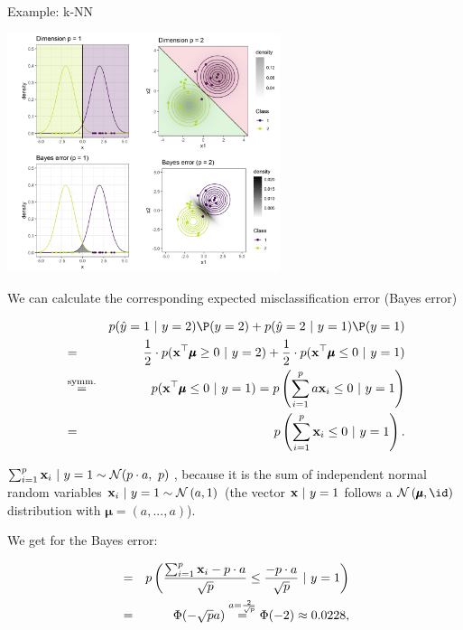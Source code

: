 \documentclass[11pt,compress,t,notes=noshow, xcolor=table]{beamer}
\begin{document}
\begin{vbframe}{Example: k-NN}
\begin{center}
\includegraphics[width = 8cm]{figure/knn_error_plot.png}
\end{center}


\framebreak 

We can calculate the corresponding expected misclassification error (Bayes error)

\begin{footnotesize}
\begin{eqnarray*}
&&  p(\hat y = 1 ~|~y = 2)\P(y = 2) + p(\hat y = 2 ~|~y = 1)\P(y = 1)\\
&=& \frac{1}{2} \cdot p(\xv^\top \pmb\mu \ge 0 ~|~ y = 2) + \frac{1}{2} \cdot p(\xv^\top \pmb\mu \le 0 ~|~ y = 1) \\
&\overset{\text{symm.}}{=}& p(\xv^\top \pmb\mu \le 0 ~|~ y = 1) = p\left(\sum_{i = 1}^p a \xv_i \le 0 ~|~ y = 1\right)\\
  &=& p\left(\sum_{i = 1}^p \xv_i \le 0 ~|~ y = 1\right). 
\end{eqnarray*}
\end{footnotesize}

$\sum_{i = 1}^p \mathbf{x}_i ~|~ y = 1\sim \mathcal{N}(p \cdot a,~ p)$\,, because it is the sum of independent normal random variables $\mathbf{x}_i ~|~ y = 1 \sim \mathcal{N}\left(a, 1\right)$ (the vector $\mathbf{x} ~|~ y = 1$ follows a $\mathcal{N}\left(\pmb\mu, \id\right)$ distribution with $\pmb\mu = \left(a, ..., a\right)$). 

\framebreak 

We get for the Bayes error: 

\begin{eqnarray*}
 &=& p\left(\frac{\sum_{i = 1}^p \mathbf{x}_i - p \cdot a}{\sqrt{p}} \le \frac{- p\cdot a}{\sqrt{p}} ~|~ y = 1\right) \\ &=& \Phi(- \sqrt{p} a) \overset{a = \frac{2}{\sqrt{p}}}{=} \Phi(- 2) \approx 0.0228,
\end{eqnarray*}


\end{vbframe}
\end{document}
